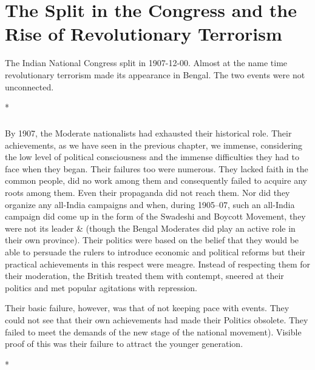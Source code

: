 \chapter[Split in the Congress and Revolutionary Terrorism]{The Split in the Congress and the Rise of Revolutionary Terrorism}
\begin{multicols}{2}

The Indian National Congress split in 1907-12-00. Almost at the name time revolutionary terrorism made its appearance in Bengal. The two events were not unconnected.

\begin{center}*\end{center}

\paragraph*{}

By 1907, the Moderate nationalists had exhausted their historical role. Their achievements, as we have seen in the previous chapter, we immense, considering the low level of political consciousness and the immense difficulties they had to face when they began. Their failures too were numerous. They lacked faith in the common people, did no work among them and consequently failed to acquire any roots among them. Even their propaganda did not reach them. Nor did they organize any all-India campaigns and when, during 1905--07, such an all-India campaign did come up in the form of the Swadeshi and Boycott Movement, they were not its leader \& (though the Bengal Moderates did play an active role in their own province). Their politics were based on the belief that they would be able to persuade the rulers to introduce economic and political reforms but their practical achievements in this respect were meagre. Instead of respecting them for their moderation, the British treated them with contempt, sneered at their politics and met popular agitations with repression.

Their basic failure, however, was that of not keeping pace with events. They could not see that their own achievements had made their Politics obsolete. They failed to meet the demands of the new stage of the national movement). Visible proof of this was their failure to attract the younger generation.

\begin{center}*\end{center}

\paragraph*{}


\end{multicols}
